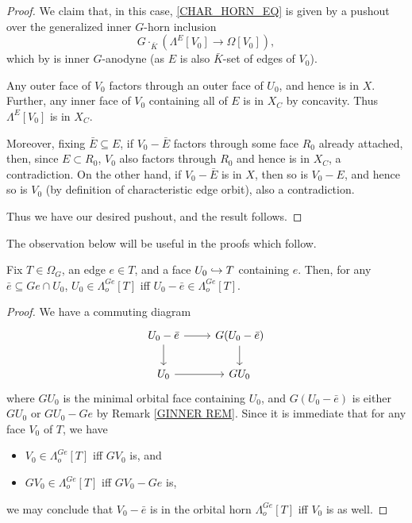 \documentclass[a4paper,10pt,draft]{article}%
\begin{document}
{\begin{proof}
      We claim that, in this case, \eqref{CHAR_HORN_EQ} is given by a pushout over
      the generalized inner $G$-horn inclusion
      \begin{equation}
            G \cdot_{\bar K} \left( \Lambda^{E}[V_0] \to \Omega[V_0] \right),
      \end{equation}
      which by \cite[Proposition 6.17]{Per17} is inner $G$-anodyne
      (as $E$ is also $\bar K$-set of edges of $V_0$).
      
      Any outer face of $V_0$ factors through an outer face of $U_0$, and hence is in $X$.
      Further, any inner face of $V_0$ containing all of $E$
      is in $X_C$ by concavity.
      Thus $\Lambda^{E}[V_0]$ is in $X_C$.

      Moreover, fixing $\bar E \subseteq E$, %
      if $V_0 - \bar E$ factors through some face $R_0$ already attached,
      then, since $E \subset R_0$, $V_0$ also factors through $R_0$ and hence is in $X_C$, a contradiction.
      On the other hand,
      if $V_0 - \bar E$ is in $X$,
      then so is $V_0 - E$, and hence
      so is $V_0$ (by definition of characteristic edge orbit), also a contradiction.

      Thus we have our desired pushout, and the result follows.
\end{proof}

The observation below will be useful in the proofs which follow.
\begin{lemma}
      \label{FOF_OHORN_LEM}
      Fix $T \in \Omega_G$, an edge $e \in T$, and a face $U_0 \hookrightarrow T$ containing $e$. Then,
      for any $\bar e \subseteq G e \cap U_0$,
      $U_0 \in \Lambda^{G e}_o[T]$ iff $U_0 - \bar e \in \Lambda^{G e}_o[T]$. 
\end{lemma}
\begin{proof}
      We have a commuting diagram
      \begin{equation}
            \begin{tikzcd}
                  U_0 - \bar e \arrow[r] \arrow[d]
                  &
                  G (U_0 - \bar e) \arrow[d]
                  \\
                  U_0\arrow[r]
                  &
                  G U_0
            \end{tikzcd}
      \end{equation}
      where $G U_0$ is the minimal orbital face containing $U_0$, and
      $G (U_0 - \bar e)$ is either $G U_0$ or $G U_0 - G e$ by Remark \ref{GINNER REM}.
      Since it is immediate that for any face $V_0$ of $T$, we have
      \begin{itemize}
      \item $V_0 \in \Lambda^{G e}_o[T]$ iff $G V_0$ is, and
      \item $G V_0 \in \Lambda^{G e}_o[T]$ iff $G V_0 - G e$ is,
      \end{itemize}
      we may conclude that
      $V_0 - \bar e$ is in the orbital horn $\Lambda^{G e}_o[T]$
      iff
      $V_0$ is as well.
\end{proof}

}
\end{document}
